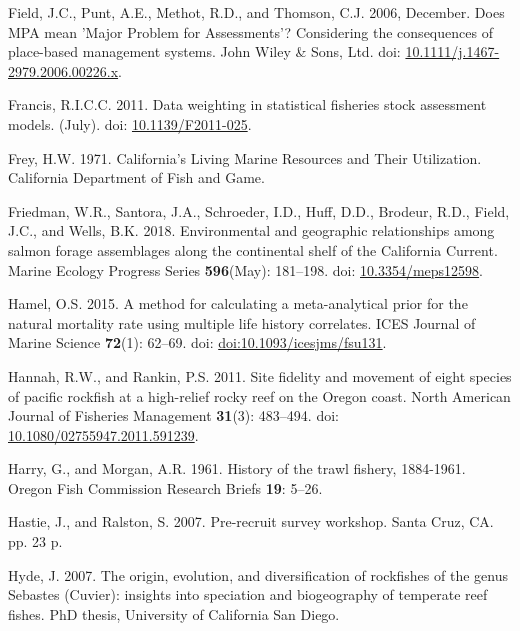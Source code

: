 \documentclass[
  english,
  a4paper,
]{article}
\newlength{\cslhangindent}
\newlength{\cslentryspacingunit} %
\newenvironment{CSLReferences}[2] %
 {%
  \setlength{\parindent}{0pt}
  \ifodd #1
  \let\oldpar\par
  \def\par{\hangindent=\cslhangindent\oldpar}
  \fi
  \setlength{\parskip}{#2\cslentryspacingunit}
 }%
 {}
\begin{document}
\begin{CSLReferences}{1}{0}
\leavevmode{}%
Field, J.C., Punt, A.E., Methot, R.D., and Thomson, C.J. 2006, December. {Does MPA mean 'Major Problem for Assessments'? Considering the consequences of place-based management systems}. John Wiley \& Sons, Ltd. doi: \href{https://doi.org/10.1111/j.1467-2979.2006.00226.x}{10.1111/j.1467-2979.2006.00226.x}.

\leavevmode{}%
Francis, R.I.C.C. 2011. {Data weighting in statistical fisheries stock assessment models}. (July). doi: \href{https://doi.org/10.1139/F2011-025}{10.1139/F2011-025}.

\leavevmode{}%
Frey, H.W. 1971. {California's Living Marine Resources and Their Utilization. California Department of Fish and Game}.

\leavevmode{}%
Friedman, W.R., Santora, J.A., Schroeder, I.D., Huff, D.D., Brodeur, R.D., Field, J.C., and Wells, B.K. 2018. {Environmental and geographic relationships among salmon forage assemblages along the continental shelf of the California Current}. Marine Ecology Progress Series \textbf{596}(May): 181--198. doi: \href{https://doi.org/10.3354/meps12598}{10.3354/meps12598}.

\leavevmode{}%
Hamel, O.S. 2015. {A method for calculating a meta-analytical prior for the natural mortality rate using multiple life history correlates}. ICES Journal of Marine Science \textbf{72}(1): 62--69. doi: \href{https://doi.org/doi:10.1093/icesjms/fsu131}{doi:10.1093/icesjms/fsu131}.

\leavevmode{}%
Hannah, R.W., and Rankin, P.S. 2011. {Site fidelity and movement of eight species of pacific rockfish at a high-relief rocky reef on the Oregon coast}. North American Journal of Fisheries Management \textbf{31}(3): 483--494. doi: \href{https://doi.org/10.1080/02755947.2011.591239}{10.1080/02755947.2011.591239}.

\leavevmode{}%
Harry, G., and Morgan, A.R. 1961. {History of the trawl fishery, 1884-1961}. Oregon Fish Commission Research Briefs \textbf{19}: 5--26.

\leavevmode{}%
Hastie, J., and Ralston, S. 2007. {Pre-recruit survey workshop}. Santa Cruz, CA. pp. 23 p.

\leavevmode{}%
Hyde, J. 2007. {The origin, evolution, and diversification of rockfishes of the genus Sebastes (Cuvier): insights into speciation and biogeography of temperate reef fishes}. PhD thesis, University of California San Diego.


\end{CSLReferences}
\end{document}
